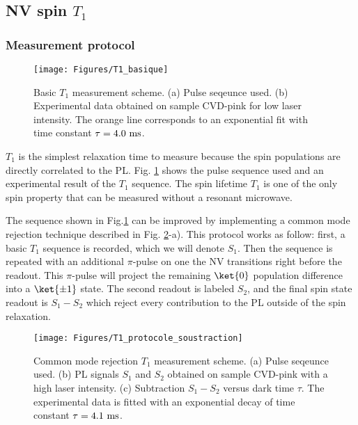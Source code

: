 \documentclass[a4paper,11pt]{report}
\begin{document}
\subsection{NV spin $T_1$}
\label{sec T1 NV}
\subsubsection{Measurement protocol}
\begin{figure}[h!]
\centering
\texttt{[image: Figures/T1\_basique]}
\caption{Basic $T_1$ measurement scheme. (a) Pulse seqeunce used. (b) Experimental data obtained on sample CVD-pink for low laser intensity. The orange line corresponds to an exponential fit with time constant $\tau=4.0\ \rm ms$.}
\label{T1 basique}
\end{figure}


$T_1$ is the simplest relaxation time to measure because the spin populations are directly correlated to the PL. Fig. \ref{T1 basique} shows the pulse sequence used and an experimental result of the $T_1$ sequence. The spin lifetime $T_1$ is one of the only spin property that can be measured without a resonant microwave.

The sequence shown in Fig.\ref{T1 basique} can be improved by implementing a common mode rejection technique described in Fig. \ref{T1 soustraction}-a). This protocol works as follow: first, a basic $T_1$ sequence is recorded, which we will denote $S_1$. Then the sequence is repeated with an additional $\pi$-pulse on one the NV transitions right before the readout. This $\pi$-pulse will project the remaining $\ket{0}$ population difference into a $\ket{\pm 1}$ state. The second readout is labeled $S_2$, and the final spin state readout is $S_1 -S_2$ which reject every contribution to the PL outside of the spin relaxation. 

\begin{figure}[h!]
\centering
\texttt{[image: Figures/T1\_protocole\_soustraction]}
\caption{Common mode rejection $T_1$ measurement scheme. (a) Pulse seqeunce used. (b) PL signals $S_1$ and $S_2$ obtained on sample CVD-pink with a high laser intensity. (c) Subtraction $S_1-S_2$ versus dark time $\tau$. The experimental data is fitted with an exponential decay of time constant $\tau=4.1\ \rm ms$.}
\label{T1 soustraction}
\end{figure}
\end{document}

